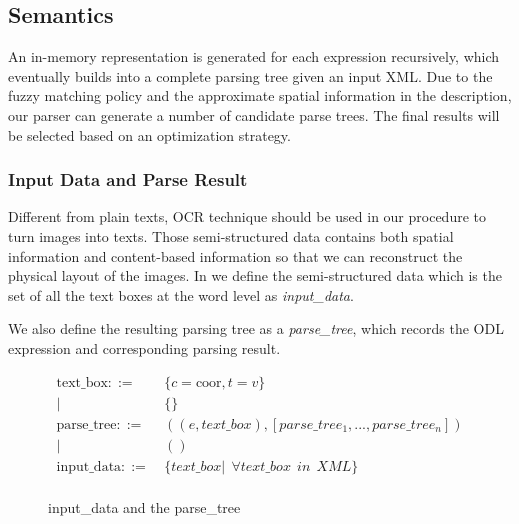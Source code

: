 \subsection{Semantics}
\label{sec:semantics}
An in-memory representation is generated for each expression recursively,
which eventually builds into a complete parsing tree given an input XML.
Due to the fuzzy matching policy and the approximate spatial information
in the description, our parser can generate a number of candidate parse
trees.  The final results will be selected based on an optimization strategy.

\subsubsection{Input Data and Parse Result}
Different from plain texts, OCR technique should be used in our procedure to
turn images into texts. Those semi-structured data contains both spatial information and content-based information so that we can reconstruct the physical
	layout of the images.
In  we define the semi-structured data which is the set of all the text boxes at the word level as {\em input\_data}.

We also define the resulting parsing tree as a {\em parse\_tree},
which records the ODL expression and corresponding parsing result.
\begin{figure}[ht!]
\centering
\begin{align*}
		   \text{text\_box} ::=~&\{c=\text{coor}, t=v\}\\
		   |~& \{\}\\
		   \text{parse\_tree} ::=~&((e,text\_box), [parse\_tree_1,...,parse\_tree_n])\\
		   |~& ()\\
\text{input\_data} ::=~&\{text\_box | ~~ \forall text\_box ~~in ~~XML\}\\
\end{align*}
\caption{input\_data and the parse\_tree}
\label{fig:data}
\end{figure}
